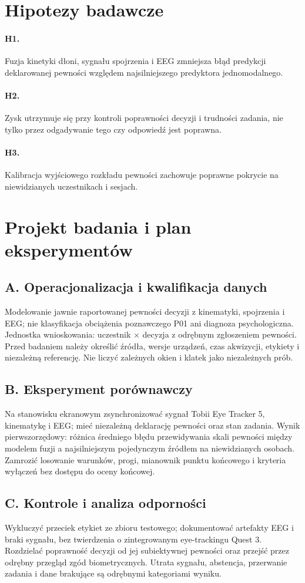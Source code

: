 \documentclass[11pt,a4paper]{article}
\begin{document}
\section{Hipotezy badawcze}
\paragraph{H1.} Fuzja kinetyki dłoni, sygnału spojrzenia i EEG zmniejsza błąd predykcji deklarowanej pewności względem najsilniejszego predyktora jednomodalnego.
\paragraph{H2.} Zysk utrzymuje się przy kontroli poprawności decyzji i trudności zadania, nie tylko przez odgadywanie tego czy odpowiedź jest poprawna.
\paragraph{H3.} Kalibracja wyjściowego rozkładu pewności zachowuje poprawne pokrycie na niewidzianych uczestnikach i sesjach.
\section{Projekt badania i plan eksperymentów}
\subsection{A. Operacjonalizacja i kwalifikacja danych}
Modelowanie jawnie raportowanej pewności decyzji z kinematyki, spojrzenia i EEG; nie klasyfikacja obciążenia poznawczego P01 ani diagnoza psychologiczna. Jednostka wnioskowania: uczestnik × decyzja z odrębnym zgłoszeniem pewności. Przed badaniem należy określić źródła, wersje urządzeń, czas akwizycji, etykiety i niezależną referencję. Nie liczyć zależnych okien i klatek jako niezależnych prób.
\subsection{B. Eksperyment porównawczy}
Na stanowisku ekranowym zsynchronizować sygnał Tobii Eye Tracker 5, kinematykę i EEG; mieć niezależną deklarację pewności oraz stan zadania. Wynik pierwszorzędowy: różnica średniego błędu przewidywania skali pewności między modelem fuzji a najsilniejszym pojedynczym źródłem na niewidzianych osobach. Zamrozić losowanie warunków, progi, mianownik punktu końcowego i kryteria wyłączeń bez dostępu do oceny końcowej.
\subsection{C. Kontrole i analiza odporności}
Wykluczyć przeciek etykiet ze zbioru testowego; dokumentować artefakty EEG i braki sygnału, bez twierdzenia o zintegrowanym eye-trackingu Quest 3. Rozdzielać poprawność decyzji od jej subiektywnej pewności oraz przejść przez odrębny przegląd zgód biometrycznych. Utrata sygnału, abstencja, przerwanie zadania i dane brakujące są odrębnymi kategoriami wyniku.
\end{document}
